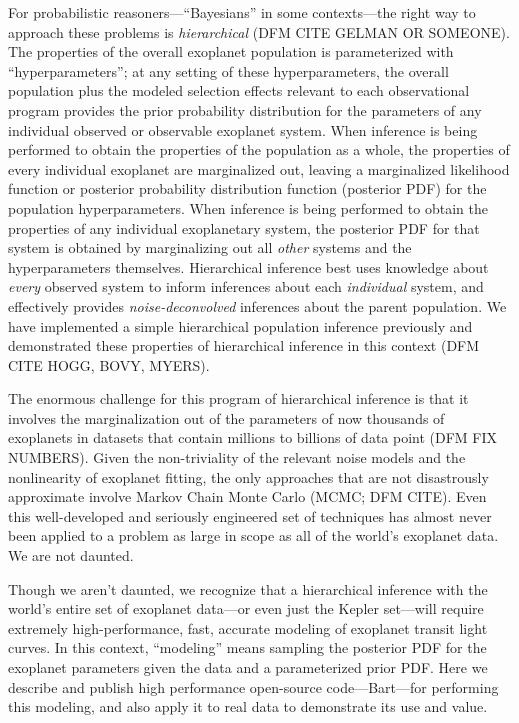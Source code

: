 \documentclass[12pt,preprint]{aastex}
\newcommand{\project}[1]{{\sffamily #1}}
\newcommand{\bart}{\project{Bart}}
\begin{document}
For probabilistic reasoners---``Bayesians'' in some contexts---the
right way to approach these problems is \emph{hierarchical} (DFM CITE
GELMAN OR SOMEONE).  The properties of the overall exoplanet
population is parameterized with ``hyperparameters''; at any setting
of these hyperparameters, the overall population plus the modeled
selection effects relevant to each observational program provides
the prior probability distribution for the parameters of any
individual observed or observable exoplanet system.  When inference is
being performed to obtain the properties of the population as a whole,
the properties of every individual exoplanet are marginalized out,
leaving a marginalized likelihood function or posterior probability
distribution function (posterior PDF) for the population
hyperparameters.  When inference is being performed to obtain the
properties of any individual exoplanetary system, the posterior PDF
for that system is obtained by marginalizing out all \emph{other}
systems and the hyperparameters themselves.  Hierarchical inference
best uses knowledge about \emph{every} observed system to inform
inferences about each \emph{individual} system, and effectively
provides \emph{noise-deconvolved} inferences about the parent
population.  We have implemented a simple hierarchical population
inference previously and demonstrated these properties of hierarchical
inference in this context (DFM CITE HOGG, BOVY, MYERS).

The enormous challenge for this program of hierarchical inference is
that it involves the marginalization out of the parameters of now
thousands of exoplanets in datasets that contain millions to billions
of data point (DFM FIX NUMBERS).  Given the non-triviality of the
relevant noise models and the nonlinearity of exoplanet fitting, the
only approaches that are not disastrously approximate involve Markov
Chain Monte Carlo (MCMC; DFM CITE).  Even this well-developed and
seriously engineered set of techniques has almost never been applied
to a problem as large in scope as all of the world's exoplanet data.
We are not daunted.

Though we aren't daunted, we recognize that a hierarchical inference
with the world's entire set of exoplanet data---or even just the
\project{Kepler} set---will require extremely high-performance, fast,
accurate modeling of exoplanet transit light curves.  In this context,
``modeling'' means sampling the posterior PDF for the exoplanet
parameters given the data and a parameterized prior PDF.  Here we
describe and publish high performance open-source code---\bart---for performing
this modeling, and also apply it to real data to demonstrate its use
and value.
\end{document}
